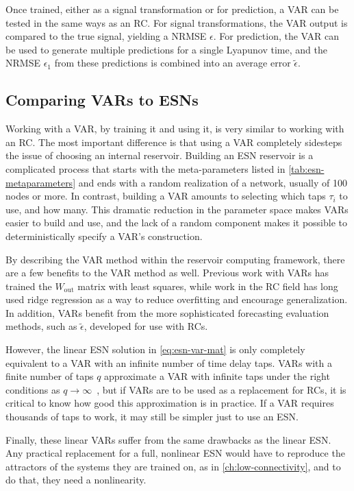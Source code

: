 Once trained, either as a signal transformation or for prediction, a
VAR can be tested in the same ways as an RC. For signal
transformations, the VAR output is compared to the true signal,
yielding a NRMSE $\epsilon$. For prediction, the VAR can be used to
generate multiple predictions for a single Lyapunov time, and the
NRMSE $\epsilon_1$ from these predictions is combined into an average
error $\tilde{\epsilon}$.

\subsection{Comparing VARs to ESNs}

Working with a VAR, by training it and using it, is very similar to
working with an RC. The most important difference is that using a VAR
completely sidesteps the issue of choosing an internal
reservoir. Building an ESN reservoir is a complicated process that
starts with the meta-parameters listed in
\cref{tab:esn-metaparameters} and ends with a random realization of a
network, usually of 100 nodes or more. In contrast, building a VAR
amounts to selecting which taps $\tau_i$ to use, and how many. This
dramatic reduction in the parameter space makes VARs easier to build
and use, and the lack of a random component makes it possible to
deterministically specify a VAR's construction.

By describing the VAR method within the reservoir computing framework,
there are a few benefits to the VAR method as well. Previous work with
VARs has trained the $W_\text{out}$ matrix with least squares, while
work in the RC field has long used ridge regression as a way to reduce
overfitting and encourage generalization. In addition, VARs benefit
from the more sophisticated forecasting evaluation methods, such as
$\tilde{\epsilon}$, developed for use with RCs.

However, the linear ESN solution in \cref{eq:esn-var-mat} is only
completely equivalent to a VAR with an infinite number of time delay
taps. VARs with a finite number of taps $q$ approximate a VAR
with infinite taps under the right conditions as $q \rightarrow
\infty$~\cite{bollt2021}, but if VARs are to be used as a replacement
for RCs, it is critical to know how good this approximation is in
practice. If a VAR requires thousands of taps to work, it may still
be simpler just to use an ESN.

Finally, these linear VARs suffer from the same drawbacks as the
linear ESN. Any practical replacement for a full, nonlinear ESN would have to
reproduce the attractors of the systems they are trained on, as in
\cref{ch:low-connectivity}, and to do that, they need a nonlinearity.

